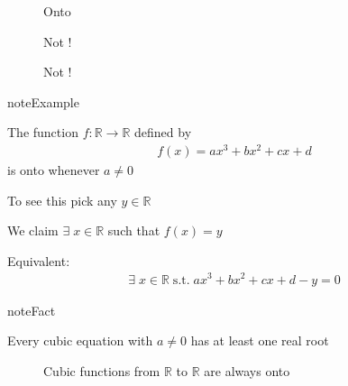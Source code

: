 \documentclass[letterpaper,10pt,english]{jupyterBook}
\begin{document}
\begin{figure}[htbp]
\centering
\capstart

\noindent{}
\caption{Onto}\label{\detokenize{03.set_theory:bijection3}}\end{figure}

\begin{figure}[htbp]
\centering
\capstart

\noindent{}
\caption{Not !}\label{\detokenize{03.set_theory:function3}}\end{figure}

\begin{figure}[htbp]
\centering
\capstart

\noindent{}
\caption{Not !}\label{\detokenize{03.set_theory:bijection22}}\end{figure}

\begin{sphinxadmonition}{note}{Example}

\sphinxAtStartPar
The function \(f \colon \mathbb{R} \to \mathbb{R}\) defined by
\begin{equation*}
\begin{split}
f(x) = ax^3 + b x^2 + cx + d
\end{split}
\end{equation*}
\sphinxAtStartPar
is onto whenever \(a \ne 0\)
\end{sphinxadmonition}

\sphinxAtStartPar
To see this pick any \(y \in \mathbb{R}\)

\sphinxAtStartPar
We claim \(\exists \; x \in \mathbb{R}\) such that \(f(x) = y\)

\sphinxAtStartPar
Equivalent:
\begin{equation*}
\begin{split}
\exists \; x \in \mathbb{R} \; \mathrm{s.t.} \;
ax^3 + b x^2 + cx + d - y = 0
\end{split}
\end{equation*}
\begin{sphinxadmonition}{note}{Fact}

\sphinxAtStartPar
Every cubic equation with \(a \ne 0\) has at least one real root
\end{sphinxadmonition}

\begin{figure}[htbp]
\centering
\capstart

\noindent{}
\caption{Cubic functions from \(\mathbb{R}\) to \(\mathbb{R}\) are always onto}\label{\detokenize{03.set_theory:cubic}}\end{figure}
\end{document}
